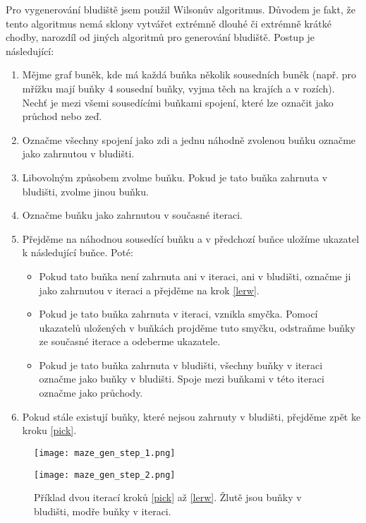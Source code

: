 Pro vygenerování bludiště jsem použil Wilsonův algoritmus. Důvodem je fakt, že tento algoritmus nemá sklony vytvářet extrémně dlouhé či extrémně krátké chodby, narozdíl od jiných algoritmů pro generování bludiště. Postup je následující: \cite{enwiki:1193338583}

\begin{enumerate}
  \setcounter{enumi}{0}
  \item Mějme graf buněk, kde má každá buňka několik sousedních buněk (např. pro mřížku mají buňky 4 sousední buňky, vyjma těch na krajích a v rozích). Nechť je mezi všemi sousedícími buňkami spojení, které lze označit jako průchod nebo zeď.
  \item Označme všechny spojení jako zdi a jednu náhodně zvolenou buňku označme jako zahrnutou v bludišti.
  \item Libovolným způsobem zvolme buňku. Pokud je tato buňka zahrnuta v bludišti, zvolme jinou buňku. \label{pick}
  \item Označme buňku jako zahrnutou v současné iteraci.
  \item Přejděme na náhodnou sousedící buňku a v předchozí buňce uložíme ukazatel k následující buňce. Poté: \label{lerw}
        \begin{itemize}
          \item Pokud tato buňka není zahrnuta ani v iteraci, ani v bludišti, označme ji jako zahrnutou v iteraci a přejděme na krok \ref{lerw}.
          \item Pokud je tato buňka zahrnuta v iteraci, vznikla smyčka. Pomocí ukazatelů uložených v buňkách projděme tuto smyčku, odstraňme buňky ze současné iterace a odeberme ukazatele.
          \item Pokud je tato buňka zahrnuta v bludišti, všechny buňky v iteraci označme jako buňky v bludišti. Spoje mezi buňkami v této iteraci označme jako průchody.
        \end{itemize}
  \item Pokud stále existují buňky, které nejsou zahrnuty v bludišti, přejděme zpět ke kroku \ref{pick}.
\end{enumerate}

\begin{figure}[H]
  \centering

  \begin{minipage}{.5\textwidth}
    \centering
    \texttt{[image: maze\_gen\_step\_1.png]}
  \end{minipage}%
  \begin{minipage}{.5\textwidth}
    \centering
    \texttt{[image: maze\_gen\_step\_2.png]}
  \end{minipage}

  \caption{Příklad dvou iterací kroků \ref{pick} až \ref{lerw}. Žlutě jsou buňky v bludišti, modře buňky v iteraci.}
\end{figure}

